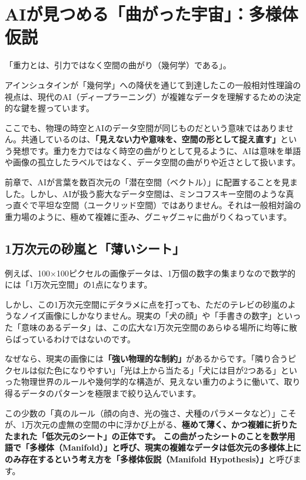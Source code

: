 \section{AIが見つめる「曲がった宇宙」：多様体仮説}

「重力とは、引力ではなく空間の曲がり（幾何学）である」。

アインシュタインが「幾何学」への降伏を通じて到達したこの一般相対性理論の視点は、現代のAI（ディープラーニング）が複雑なデータを理解するための決定的な鍵を握っています。

ここでも、物理の時空とAIのデータ空間が同じものだという意味ではありません。共通しているのは、\textbf{「見えない力や意味を、空間の形として捉え直す」}という発想です。重力を力ではなく時空の曲がりとして見るように、AIは意味を単語や画像の孤立したラベルではなく、データ空間の曲がりや近さとして扱います。

前章で、AIが言葉を数百次元の「潜在空間（ベクトル）」に配置することを見ました。しかし、AIが扱う膨大なデータ空間は、ミンコフスキー空間のような真っ直ぐで平坦な空間（ユークリッド空間）ではありません。それは一般相対論の重力場のように、極めて複雑に歪み、グニャグニャに曲がりくねっています。

\subsection{1万次元の砂嵐と「薄いシート」}

例えば、100×100ピクセルの画像データは、1万個の数字の集まりなので数学的には「1万次元空間」の1点になります。

しかし、この1万次元空間にデタラメに点を打っても、ただのテレビの砂嵐のようなノイズ画像にしかなりません。現実の「犬の顔」や「手書きの数字」といった「意味のあるデータ」は、この広大な1万次元空間のあらゆる場所に均等に散らばっているわけではないのです。

なぜなら、現実の画像には\textbf{「強い物理的な制約」}があるからです。「隣り合うピクセルは似た色になりやすい」「光は上から当たる」「犬には目が2つある」といった物理世界のルールや幾何学的な構造が、見えない重力のように働いて、取り得るデータのパターンを極限まで絞り込んでいます。

この少数の「真のルール（顔の向き、光の強さ、犬種のパラメータなど）」こそが、1万次元の虚無の空間の中に浮かび上がる、\textbf{極めて薄く、かつ複雑に折りたたまれた「低次元のシート」の正体です。 この曲がったシートのことを数学用語で「多様体（Manifold）」と呼び、現実の複雑なデータは低次元の多様体上にのみ存在するという考え方を「多様体仮説（Manifold Hypothesis）」}と呼びます。

